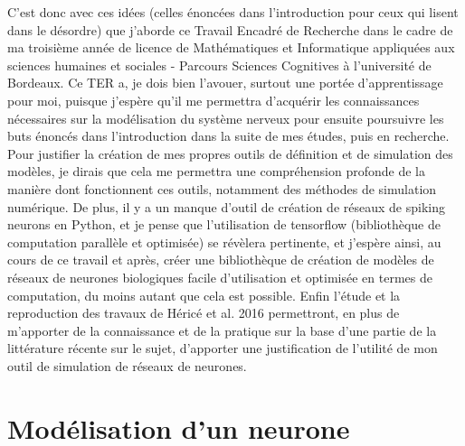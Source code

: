 \documentclass[12pt]{scrartcl}
\begin{document}
C'est donc avec ces idées (celles énoncées dans l'introduction pour ceux qui lisent dans le désordre) que j'aborde ce Travail Encadré de Recherche dans le cadre de ma troisième année de licence de Mathématiques et Informatique appliquées aux sciences humaines et sociales - Parcours Sciences Cognitives à l'université de Bordeaux. Ce TER a, je dois bien l'avouer, surtout une portée d'apprentissage pour moi, puisque j'espère qu'il me permettra d'acquérir les connaissances nécessaires sur la modélisation du système nerveux pour ensuite poursuivre les buts énoncés dans l'introduction dans la suite de mes études, puis en recherche. Pour justifier la création de mes propres outils de définition et de simulation des modèles, je dirais que cela me permettra une compréhension profonde de la manière dont fonctionnent ces outils, notamment des méthodes de simulation numérique. De plus, il y a un manque d'outil de création de réseaux de spiking neurons en Python, et je pense que l'utilisation de tensorflow (bibliothèque de computation parallèle et optimisée) se révèlera pertinente, et j'espère ainsi, au cours de ce travail et après, créer une bibliothèque de création de modèles de réseaux de neurones biologiques facile d'utilisation et optimisée en termes de computation, du moins autant que cela est possible. Enfin l'étude et la reproduction des travaux de Héricé et al. 2016 permettront, en plus de m'apporter de la connaissance et de la pratique sur la base d'une partie de la littérature récente sur le sujet, d'apporter une justification de l'utilité de mon outil de simulation de réseaux de neurones.

\pagebreak

\part{Modélisation d'un neurone}
\end{document}
